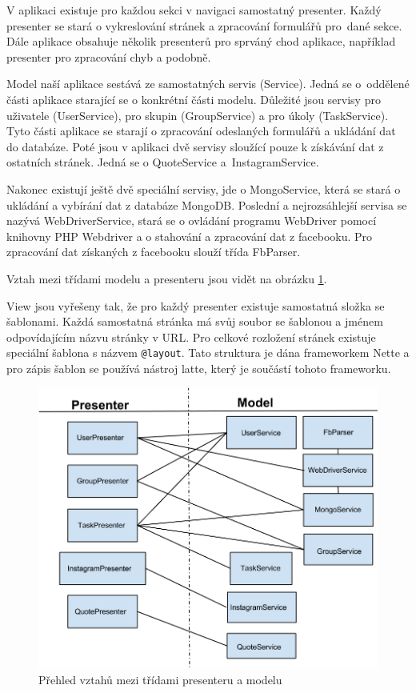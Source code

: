 \documentclass[thesis=M,czech]{FITthesis}[2013/05/10]
\begin{document}
V aplikaci existuje pro každou sekci v navigaci samostatný presenter. Každý presenter se stará o vykreslování stránek  a zpracování formulářů pro~dané sekce. Dále aplikace obsahuje několik presenterů pro sprváný chod aplikace, například presenter pro zpracování chyb a podobně.

Model naší aplikace sestává ze samostatných servis (Service). Jedná se o~oddělené části aplikace starající se o konkrétní části modelu. Důležité jsou servisy pro uživatele (UserService), pro skupin (GroupService) a pro úkoly (TaskService). Tyto části aplikace se starají o zpracování odeslaných formulářů a ukládání dat do databáze. Poté jsou v aplikaci dvě servisy sloužící pouze k získávání dat z ostatních stránek. Jedná se o QuoteService a~InstagramService. 

Nakonec existují ještě dvě speciální servisy, jde o MongoService, která se stará o ukládání a vybírání dat z databáze MongoDB. Poslední a nejrozsáhlejší servisa se nazývá WebDriverService, stará se o ovládání programu WebDriver pomocí knihovny PHP Webdriver a o stahování a zpracování dat z facebooku. Pro zpracování dat získaných z facebooku slouží třída FbParser.

Vztah mezi třídami modelu a presenteru jsou vidět na obrázku \ref{fig:fcModelPresenter}.

View jsou vyřešeny tak, že pro každý presenter existuje samostatná složka se šablonami. Každá samostatná stránka má svůj soubor se šablonou a jménem odpovídajícím názvu stránky v URL. Pro celkové rozložení stránek existuje speciální šablona s názvem \verb|@layout|. Tato struktura je dána frameworkem Nette a pro zápis šablon se používá nástroj latte, který je součástí tohoto frameworku. 

\begin{figure}[h]
\begin{center}
\includegraphics[width=5in]{figures/fcModelPresenter.png}
\caption{Přehled vztahů mezi třídami presenteru a modelu}
\label{fig:fcModelPresenter}
\end{center}
\end{figure}
\end{document}
